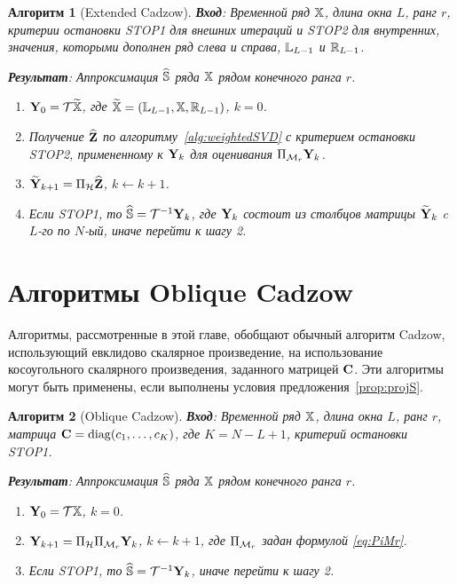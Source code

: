 \documentclass[12pt, specialist, subf,href,colorlinks=true,substylefile = spbu.rtx]{disser}
\newtheorem{algorithm}{Алгоритм}
\theoremstyle{remark}
\theoremstyle{definition}
\begin{document}
\begin{algorithm}[Extended Cadzow] \label{alg:ECIt}
\textbf{Вход}: Временной ряд $\mathbb{X}$, длина окна $L$, ранг $r$,
критерии остановки STOP1 для внешних итераций и STOP2 для внутренних,
значения, которыми дополнен ряд слева и справа, $\mathbb{L}_{L-1}$ и $\mathbb{R}_{L-1}$.

\textbf{Результат}:
Аппроксимация $\widehat{\mathbb{S}}$ ряда $\mathbb{X}$ рядом конечного ранга $r$.

\begin{enumerate}
\item
$\mathbf{Y}_0 = \mathcal{T} \widetilde{\mathbb{X}}$, где $\widetilde{\mathbb{X}}=(\mathbb{L}_{L-1}, \mathbb{X}, \mathbb{R}_{L-1})$, $k=0$.
\item
Получение $\widehat{\mathbf{Z}}$ по алгоритму~\ref{alg:weightedSVD} с критерием остановки STOP2, примененному к $\mathbf{Y}_k$ для оценивания $\Pi_{\mathcal{M}_r} \mathbf{Y}_{k}$.
\item
$\widetilde{\mathbf{Y}}_{k+1} = \Pi_{\mathcal{H}}  \widehat{\mathbf{Z}}$, $k\leftarrow k+1$.
\item
Если STOP1, то $\widehat{\mathbb{S}} = \mathcal{T}^{-1} \mathbf{Y}_k$, где $\mathbf{Y}_k$ состоит из столбцов матрицы $\widetilde{\mathbf{Y}}_{k}$
c $L$-го по $N$-ый, иначе перейти к шагу 2.
\end{enumerate}
\end{algorithm}

\section{Алгоритмы Oblique Cadzow}
\label{sec:ObliqueCadzow}
Алгоритмы, рассмотренные в этой главе, обобщают обычный алгоритм Cadzow, использующий евклидово скалярное произведение, на использование косоугольного скалярного произведения, заданного матрицей $\mathbf{C}$.
Эти алгоритмы могут быть применены, если выполнены условия предложения~\ref{prop:projS}.

\begin{algorithm}[Oblique Cadzow]
\label{alg:obliqueCadzow}
\textbf{Вход}: Временной ряд $\mathbb{X}$, длина окна $L$, ранг $r$, матрица $\mathbf{C}=\mathop{\mathrm{diag}}(c_1,\ldots, c_K)$, где $K=N-L+1$,
критерий остановки STOP1.

\textbf{Результат}:
Аппроксимация $\widehat{\mathbb{S}}$ ряда $\mathbb{X}$ рядом конечного ранга $r$.

\begin{enumerate}
\item
$\mathbf{Y}_0 = \mathcal{T} \mathbb{X}$, $k=0$.
\item
$\mathbf{Y}_{k+1} = \Pi_{\mathcal{H}}  \Pi_{\mathcal{M}_r} \mathbf{Y}_{k}$, $k\leftarrow k+1$, где
$\Pi_{\mathcal{M}_r}$ задан формулой \eqref{eq:PiMr}.
\item
Если STOP1, то $\widehat{\mathbb{S}} = \mathcal{T}^{-1} \mathbf{Y}_k$, иначе перейти к шагу 2.
\end{enumerate}
\end{algorithm}
\end{document}
